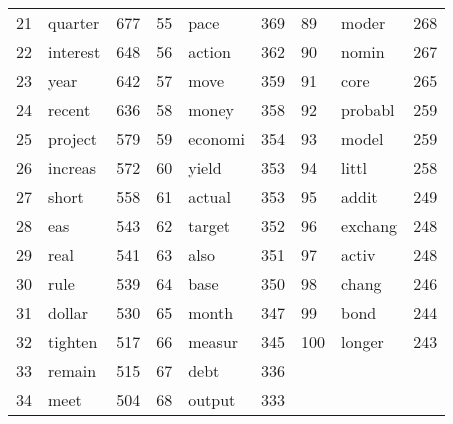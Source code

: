 \begin{tabular}{rlrrlrlll}
 21 &   quarter &   677 &  55 &       pace &   369 &   89 &    moder &   268 \\
 22 &  interest &   648 &  56 &     action &   362 &   90 &    nomin &   267 \\
 23 &      year &   642 &  57 &       move &   359 &   91 &     core &   265 \\
 24 &    recent &   636 &  58 &      money &   358 &   92 &  probabl &   259 \\
 25 &   project &   579 &  59 &    economi &   354 &   93 &    model &   259 \\
 26 &   increas &   572 &  60 &      yield &   353 &   94 &    littl &   258 \\
 27 &     short &   558 &  61 &     actual &   353 &   95 &    addit &   249 \\
 28 &       eas &   543 &  62 &     target &   352 &   96 &  exchang &   248 \\
 29 &      real &   541 &  63 &       also &   351 &   97 &    activ &   248 \\
 30 &      rule &   539 &  64 &       base &   350 &   98 &    chang &   246 \\
 31 &    dollar &   530 &  65 &      month &   347 &   99 &     bond &   244 \\
 32 &   tighten &   517 &  66 &     measur &   345 &  100 &   longer &   243 \\
 33 &    remain &   515 &  67 &       debt &   336 &      &          &       \\
 34 &      meet &   504 &  68 &     output &   333 &      &          &       \\
\bottomrule
\end{tabular}

